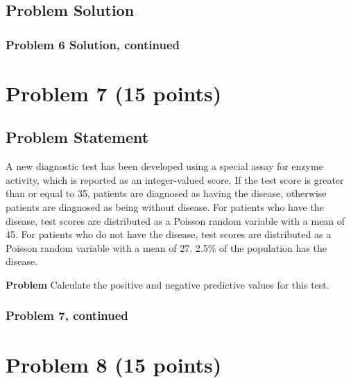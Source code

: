 \documentclass[12pt]{article}
\theoremstyle{definition}
\begin{document}
\subsection*{Problem Solution}


\newpage
\subsubsection*{Problem 6 Solution, continued}








\newpage
\section*{Problem 7 (15 points)}

\subsection*{Problem Statement}

A new diagnostic test has been developed using a special assay for enzyme activity, which is reported as an integer-valued score. If the test score is greater than or equal to 35, patients are diagnosed as having the disease, otherwise patients are diagnosed as being without disease. For patients who have the disease, test scores are distributed as a Poisson random variable with a mean of 45. For patients who do not have the disease, test scores are distributed as a Poisson random variable with a mean of 27. 2.5\% of the population has the disease.

\bigskip
\noindent
{\bf Problem} Calculate the positive and negative predictive values for this test.


\newpage
\subsubsection*{Problem 7, continued}


\newpage
\section*{Problem 8 (15 points)}
\end{document}
